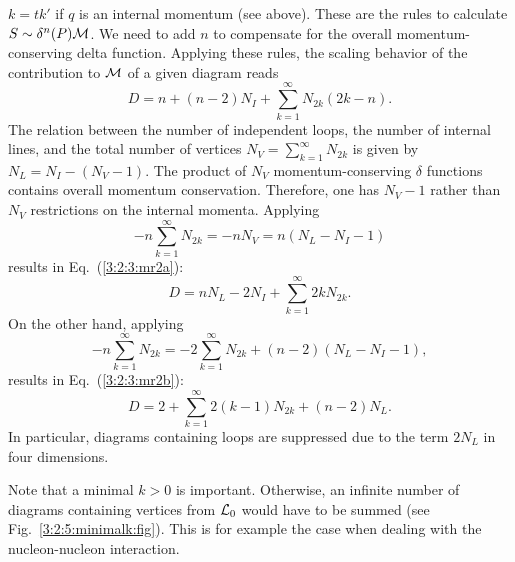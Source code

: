 \documentclass[twoside,12pt]{article}
\begin{document}
$k=tk'$ if $q$ is an internal momentum (see above).
   These are the rules to calculate $S \sim \delta^n(P) \cal M$.
   We need to add $n$ to compensate for the overall momentum-conserving
delta function.
   Applying these rules, the scaling behavior of the contribution to $\cal M$ of
a given diagram reads
\begin{displaymath}
D=n+(n-2)N_I+\sum_{k=1}^\infty N_{2k} (2k-n).
\end{displaymath}
   The relation between the number of independent loops, the number of internal
lines, and the total number of vertices $N_V=\sum_{k=1}^\infty N_{2k}$ is given
by $N_L=N_I-(N_V-1)$.
   The product of $N_V$ momentum-conserving $\delta$ functions
contains overall momentum conservation.
   Therefore, one has $N_V-1$ rather
than $N_V$ restrictions on the internal momenta.
    Applying
\begin{displaymath}
-n \sum_{k=1}^\infty N_{2k}=-n N_V=n(N_L-N_I-1)
\end{displaymath}
results in Eq.~(\ref{3:2:3:mr2a}):
\begin{displaymath}
D=n N_L-2N_I+\sum_{k=1}^\infty 2k N_{2k}.
\end{displaymath}
On the other hand, applying
\begin{displaymath}
-n \sum_{k=1}^\infty N_{2k}= -2 \sum_{k=1}^\infty N_{2k}
+(n-2)(N_L-N_I-1),
\end{displaymath}
results in Eq.~(\ref{3:2:3:mr2b}):
\begin{displaymath}
D=2+\sum_{k=1}^\infty2(k-1)N_{2k}+(n-2)N_L.
\end{displaymath}
In particular, diagrams containing loops are suppressed due to the
term $2 N_L$ in four dimensions.

   Note that a minimal $k>0$ is important.
   Otherwise, an infinite number of diagrams containing vertices from
${\cal L}_0$ would have to be summed (see Fig.\ \ref{3:2:5:minimalk:fig}).
   This is for example the case when dealing with the nucleon-nucleon
interaction.
\end{document}
